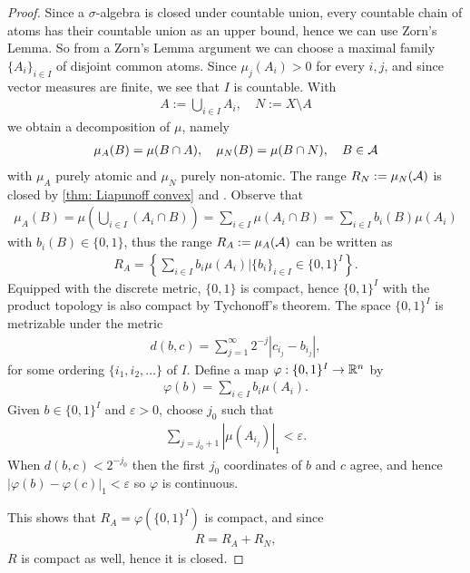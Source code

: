\documentclass[../../main.tex]{subfiles}
\begin{document}
\begin{proof}
Since a $\sigma$-algebra is closed under countable union, every countable chain of atoms has their countable union as an upper bound, hence we can use Zorn's Lemma.
So from a Zorn's Lemma argument we can choose a maximal family $\{A_{i}\}_{i\in I}$ of disjoint common atoms. Since $\mu_{j}(A_{i})>0$ for every $i,j$, and since vector measures are finite, we see that $I$ is countable. With
\begin{align*}
	A:=\bigcup_{i\in I} A_{i}, \quad N:=X\setminus A
\end{align*}
we obtain a decomposition of $\mu$, namely
\begin{align*}
	\mu_{A}(B)=\mu(B\cap A), \quad \mu_{N}(B)=\mu(B\cap N), \quad B\in \mathcal{A}
\end{align*}
with $\mu_{A}$ purely atomic and $\mu_{N}$ purely non-atomic.
The range $R_{N}:=\mu_{N}(\mathcal{A})$ is closed by \cref{thm: Liapunoff convex} and . Observe that
\begin{align*}
	\mu_{A}(B)=\mu\left( \bigcup_{i\in I} (A_{i} \cap B) \right) = \sum_{i\in I} \mu(A_{i}\cap B)=\sum_{i\in I} b_{i}(B)\mu(A_{i})
\end{align*}
with $b_{i}(B)\in \{0,1\}$, thus the range $R_{A}:=\mu_{A}(\mathcal{A})$ can be written as
\begin{align*}
	R_{A}=\left\{ \sum_{i\in I} b_{i}\mu(A_{i}) | \{b_{i}\}_{i\in I} \in \{0,1\}^{I} \right\}.
\end{align*}
Equipped with the discrete metric, $\{0,1\}$ is compact, hence $\{0,1\}^{I}$ with the product topology is also compact by Tychonoff's theorem. %
The space $\{0,1\}^{I}$ is metrizable under the metric
\begin{align*}
	d(b,c)=\sum_{j=1}^{\infty}2^{-j}|c_{i_{j}} - b_{i_{j}}|,
\end{align*}
for some ordering $\{i_{1}, i_{2}, \dots\}$ of $I$. Define a map $\varphi:\{0,1\}^{I}\to \mathbb{R}^{n}$ by
\begin{align*}
	\varphi(b)=\sum_{i\in I} b_{i} \mu(A_{i}).
\end{align*}
Given $b\in \{0,1\}^{I}$ and $\varepsilon>0$, choose $j_{0}$ such that
\begin{align*}
	\sum_{j=j_{0}+1}|\mu(A_{i_{j}})|_{1}<\varepsilon.
\end{align*}
When $d(b,c)<2^{-j_{0}}$ then the first $j_{0}$ coordinates of $b$ and $c$ agree, and hence $| \varphi(b) - \varphi(c) |_{1} < \varepsilon$ so $\varphi$ is continuous.

This shows that $R_{A}=\varphi(\{0,1\}^{I})$ is compact, and since
\begin{align*}
	R=R_{A}+R_{N},
\end{align*}
$R$ is compact as well, hence it is closed.


\end{proof}
\end{document}
